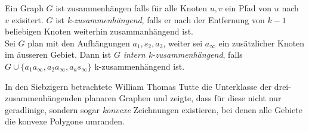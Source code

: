 \begin{definition}\label{int_3_con}
Ein Graph $G$ ist zusammenhängen falls für alle Knoten $u,v$ ein Pfad von $u$ nach $v$ exisitert. $G$ ist \textit{k-zusammenhängend}, falls er nach der Entfernung von $k-1$ beliebigen Knoten weiterhin zusammanhängend ist.\\
Sei $G$ plan mit den Aufhängungen $a_1,s_2,a_3$, weiter sei $a_\infty$ ein zusätzlicher Knoten im äusseren Gebiet. Dann ist $G$ \textit{intern k-zusammenhängend}, falls $G \cup \{ a_1a_\infty,a_2a_\infty,a_as_\infty \}$ k-zusammenhängend ist. 
\end{definition}

In den Siebzigern betrachtete William Thomas Tutte die Unterklasse der drei-zusammenhängenden planaren Graphen und zeigte, dass für diese nicht nur geradlinige, sondern sogar \textit{konvexe} Zeichnungen existieren, bei denen alle Gebiete die konvexe Polygone umranden. \cite{tutte63}





